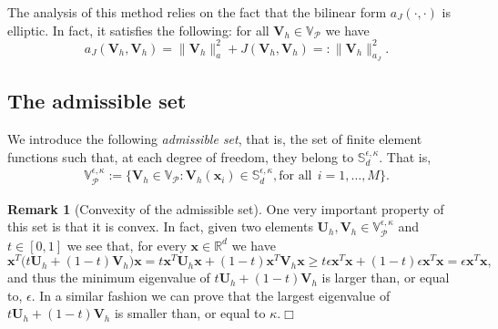 \documentclass[final,12pt]{amsart}
\theoremstyle{plain}
\theoremstyle{definition}
\newtheorem{Remark}[theorem]{Remark}
\newcommand\calP{{\mathcal{P}}}
\newcommand\bV{\mathbf{V}}
\begin{document}
The analysis of this method relies on the fact that the bilinear form $a_{J}(\cdot,\cdot)$ is elliptic. In fact,
it satisfies the following: for all $\bV_h\in\mathbb{V}_\calP^{}$ we have
\begin{equation}\label{aJ-ellipt}
a_{J}(\mathbf{V}_{h},\mathbf{V}_{h})=\|\bV_h^{}\|_{a}^2+J(\bV_h^{},\bV_h^{})=: \|\bV_h^{}\|_{a_J}^2 .
\end{equation}


\subsection{The admissible set}

We introduce the following \textit{admissible set}, that is, the set of finite element
functions such that, at each degree of freedom,  they belong to  $\mathbb{S}_{d}^{\epsilon,\kappa}$. That
is,
\begin{align}
	\mathbb{V}_{\calP}^{\epsilon,\kappa}:=\{\mathbf{V}_{h}\in \mathbb{V}_{\mathcal{P}}: \mathbf{V}_{h}(\boldsymbol{x}_{i})\in \mathbb{S}_{d}^{\epsilon,\kappa},  \text{for all}\ \ i=1,\ldots,M  \}.\label{eq16}
\end{align} 

\begin{Remark}[Convexity of the admissible set]
One very important property of this set is that it is convex. In fact, given two elements
$\mathbf{U}_{h},\mathbf{V}_{h}\in\mathbb{V}_{\mathcal{P}}^{\epsilon,\kappa}$ and
$t\in [0,1]$ we see that, for every $\mathbf{x}\in\mathbb{R}^d$ we have
\begin{equation*}
\mathbf{x}^T\big( t\mathbf{U}_{h}+(1-t)\mathbf{V}_{h}\big)\mathbf{x}
= t \mathbf{x}^T\mathbf{U}_{h}\mathbf{x} + (1-t)  \mathbf{x}^T\mathbf{V}_{h}\mathbf{x}
\ge t\epsilon \mathbf{x}^T\mathbf{x}+(1-t)\epsilon \mathbf{x}^T\mathbf{x}
= \epsilon \mathbf{x}^T\mathbf{x} ,
\end{equation*}
and thus the minimum eigenvalue of $t\mathbf{U}_{h}+(1-t)\mathbf{V}_{h}$ is larger than,  or equal to,
$\epsilon$.  In a similar fashion we can prove that the largest eigenvalue of $t\mathbf{U}_{h}+(1-t)\mathbf{V}_{h}$ is smaller than, or equal to $\kappa$.\hfill$\Box$
\end{Remark}
\end{document}
